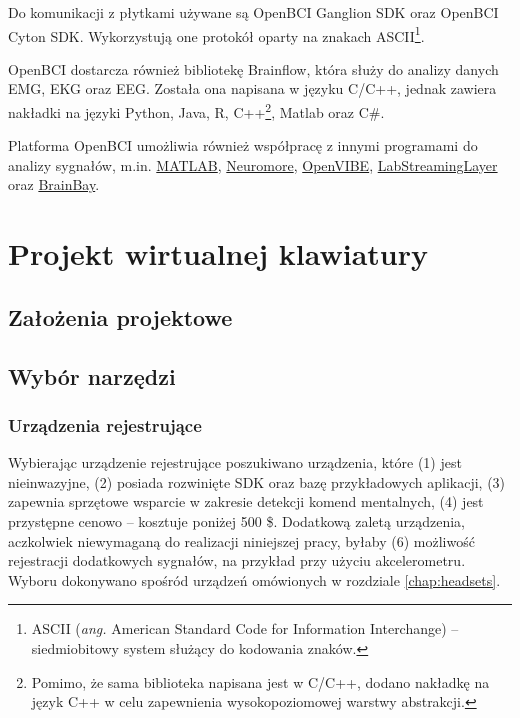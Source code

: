 \documentclass[skorowidz,skroty]{dyplomWEZUT}
\begin{document}
Do komunikacji z płytkami używane są OpenBCI Ganglion SDK oraz OpenBCI Cyton SDK. Wykorzystują one protokół oparty na znakach ASCII\footnote{ASCII (\textit{ang.} American Standard Code for Information Interchange) -- siedmiobitowy system służący do kodowania znaków.}.

OpenBCI dostarcza również bibliotekę Brainflow, która służy do analizy danych EMG, EKG oraz EEG\cite{markiv_software_brainflow}. Została ona napisana w języku C/C++, jednak zawiera nakładki na języki Python, Java, R, C++\footnote{Pomimo, że sama biblioteka napisana jest w C/C++, dodano nakładkę na język C++ w celu zapewnienia wysokopoziomowej warstwy abstrakcji.}, Matlab oraz C\#.

Platforma OpenBCI umożliwia również współpracę z innymi programami do analizy sygnałów, m.in. \href{https://www.mathworks.com/products/matlab.html}{MATLAB}, \href{https://www.neuromore.com/}{Neuromore}, \href{http://openvibe.inria.fr/}{OpenVIBE}, \href{https://github.com/sccn/labstreaminglayer}{LabStreamingLayer} oraz \href{http://www.shifz.org/brainbay/}{BrainBay}.


\chapter{Projekt wirtualnej klawiatury}
\section{Założenia projektowe}

\section{Wybór narzędzi}
\subsection{Urządzenia rejestrujące}
Wybierając urządzenie rejestrujące poszukiwano urządzenia, które (1) jest nieinwazyjne, (2) posiada rozwinięte SDK oraz bazę przykładowych aplikacji, (3) zapewnia sprzętowe wsparcie w zakresie detekcji komend mentalnych, (4) jest przystępne cenowo -- kosztuje poniżej 500 \$. Dodatkową zaletą urządzenia, aczkolwiek niewymaganą do realizacji niniejszej pracy, byłaby (6) możliwość rejestracji dodatkowych sygnałów, na przykład przy użyciu akcelerometru. Wyboru dokonywano spośród urządzeń omówionych w rozdziale \vref{chap:headsets}.
\end{document}
